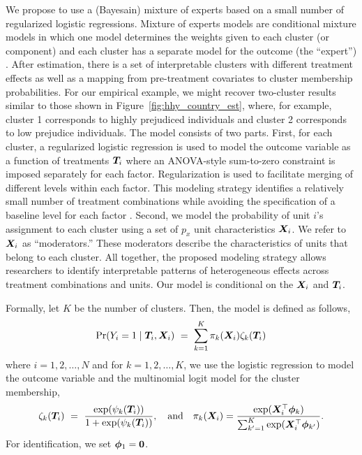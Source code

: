 We propose to use a (Bayesain) mixture of experts based on a small number of regularized logistic regressions.
Mixture of experts models are conditional mixture models in which one model determines the weights given to each cluster (or component) and each cluster has a separate model for the outcome (the ``expert'') \citep[see][for a recent review]{gormley2019mixture}. After estimation, there is a set of interpretable clusters with different treatment effects as well as a mapping from pre-treatment covariates to cluster membership probabilities. For our empirical example, we might recover two-cluster results similar to those shown in Figure~\ref{fig:hhy_country_est}, where, for example, cluster 1 corresponds to highly prejudiced individuals and cluster 2 corresponds to low prejudice individuals.
The model consists of two parts.  First,
for each cluster, a regularized logistic regression is used to model
the outcome variable as a function of treatments $\bm{T}_i$ where an
ANOVA-style sum-to-zero constraint is imposed separately for each
factor.  Regularization is used to facilitate merging of different
levels within each factor.  This modeling strategy identifies a
relatively small number of treatment combinations while avoiding the
specification of a baseline level for each factor
\citep{egam:imai:19}. Second, we model the probability of unit $i$'s
assignment to each cluster using a set of $p_x$ unit characteristics
$\bm{X}_i$.
 We refer to $\bm{X}_i$ as ``moderators.''
 These moderators describe the characteristics of units that belong to each cluster.
All together, the proposed modeling strategy allows researchers to identify interpretable patterns of heterogeneous effects across treatment combinations and units.
Our model is conditional on the $\bm{X}_i$ and $\bm{T}_i$.

Formally, let $K$ be the number of clusters.  Then, the model is
defined as follows,
\begin{equation}
\label{eq:unreg}
\Pr(Y_i = 1 \mid \bm{T}_i, \bm{X}_i) \ = \   \sum_{k=1}^K \pi_{k}(\bm{X}_i)
\zeta_{k}(\bm{T}_i) 
\end{equation}
where $i=1,2,\ldots,N$ and for $k=1,2,\ldots,K$, we use the logistic
regression to model the outcome variable and the multinomial logit
model for the cluster membership,
\begin{equation}
  \zeta_{k}(\bm{T}_i) \
= \ \frac{\exp(\psi_{k}(\bm{T}_i))}{1+\exp(\psi_{k}(\bm{T}_i))}, \quad
\text{and} \quad
\pi_{k}(\bm{X}_i) = \frac{\exp(\bm{X}_i^\top \bm{\phi}_k)}{\sum_{k'=1}^K
  \exp(\bm{X}_i^\top \bm{\phi}_{k'})}. \label{eq:basic_models}
\end{equation}
For identification, we set $\bm{\phi}_1 = \bm{0}$.

